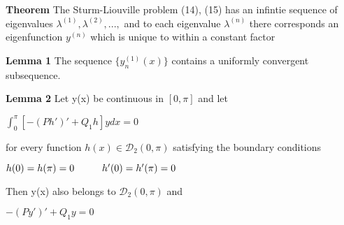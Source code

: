 \documentclass{article}
\newcommand\tab[1][1cm]{\hspace*{#1}}
\begin{document}
\textbf {Theorem} The Sturm-Liouville problem (14), (15) has an infintie sequence of eigenvalues $\lambda^{(1)}, \lambda^{(2)} ,...,$ and to each eigenvalue $\lambda^{(n)}$ there corresponds an eigenfunction $y^{(n)}$ which is unique to within a constant factor

\textbf {Lemma 1} The sequence $\{y_n^{(1)}(x) \}$ contains a uniformly convergent subsequence.

\textbf {Lemma 2} Let y(x) be continuous in $[0, \pi]$ and let
\begin{center}
$\int_0^{\pi} [ - (Ph')' + Q_1 h] y dx = 0$
\end{center}
for every function $h(x) \in \mathcal{D}_2(0,\pi)$ satisfying the boundary conditions
\begin{center}
$h(0) = h(\pi) = 0 \tab h'(0) = h'(\pi) = 0$
\end{center}
Then y(x) also belongs to $\mathcal{D}_2(0, \pi)$ and 
\begin{center}
$-(Py')' + Q_1 y = 0$
\end{center}
\end{document}
